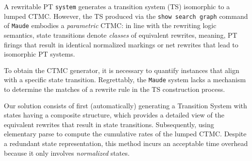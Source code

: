 A rewritable PT \texttt{system}  generates a transition system (TS) isomorphic to a lumped CTMC. 
However, the TS produced via the \texttt{show search graph} command of \texttt{Maude} embodies a \emph{parametric} CTMC: in line with the rewriting logic semantics, state transitions denote \emph{classes} of equivalent rewrites, meaning, PT firings that result in identical normalized markings or net rewrites that lead to isomorphic PT systems.

To obtain the CTMC generator, it is necessary to quantify instances that align with a specific state transition. Regrettably, the \texttt{Maude} system lacks a mechanism to determine the matches of a rewrite rule in the TS construction process.

  Our solution consists of first (automatically) generating a Transition System with states having a composite structure, which provides a detailed view of the equivalent rewrites that result in state transitions. Subsequently, using elementary parse to compute the cumulative rates of the lumped CTMC.
 Despite a redundant state representation, this method incurs an acceptable time overhead because it only involves \emph{normalized} states. 

